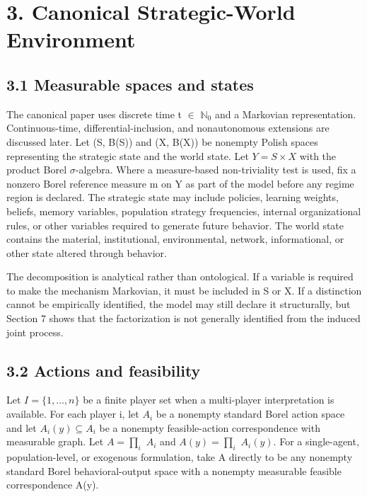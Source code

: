 \documentclass[10pt]{article}
\begin{document}
\section{3. Canonical Strategic-World
Environment}\label{canonical-strategic-world-environment}

\subsection{3.1 Measurable spaces and
states}\label{measurable-spaces-and-states}

The canonical paper uses discrete time t \(\in{}\) \(\mathbb N_0\) and a
Markovian representation. Continuous-time, differential-inclusion, and
nonautonomous extensions are discussed later. Let (S, B(S)) and (X,
B(X)) be nonempty Polish spaces representing the strategic state and the
world state. Let \(Y=S\times{}X\) with the product Borel
\(\sigma\)-algebra. Where a measure-based non-triviality test is used,
fix a nonzero Borel reference measure m on Y as part of the model before
any regime region is declared. The strategic state may include policies,
learning weights, beliefs, memory variables, population strategy
frequencies, internal organizational rules, or other variables required
to generate future behavior. The world state contains the material,
institutional, environmental, network, informational, or other state
altered through behavior.

The decomposition is analytical rather than ontological. If a variable
is required to make the mechanism Markovian, it must be included in S or
X. If a distinction cannot be empirically identified, the model may
still declare it structurally, but Section 7 shows that the
factorization is not generally identified from the induced joint
process.

\subsection{3.2 Actions and feasibility}\label{actions-and-feasibility}

Let \(I=\{1,\ldots,n\}\) be a finite player set when a multi-player
interpretation is available. For each player i, let \(A_i\) be a
nonempty standard Borel action space and let \(A_i(y)\subseteq{}A_i\) be
a nonempty feasible-action correspondence with measurable graph. Let
\(A=\prod_i\) \(A_i\) and \(A(y)=\prod_i\) \(A_i(y)\). For a
single-agent, population-level, or exogenous formulation, take A
directly to be any nonempty standard Borel behavioral-output space with
a nonempty measurable feasible correspondence A(y).
\end{document}
